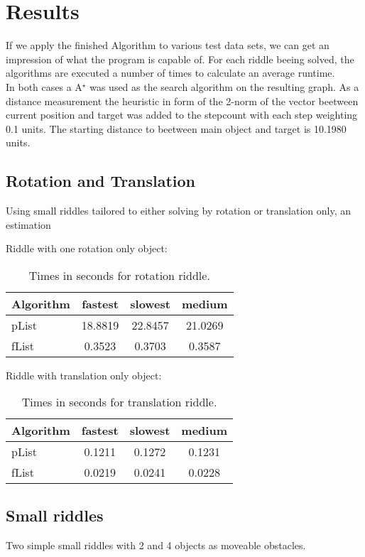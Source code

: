 \chapter{Results}
If we apply the finished Algorithm to various test data sets, we can get an impression of what the program is capable of.
For each riddle beeing solved, the algorithms are executed a number of times to calculate an average runtime.\\
In both cases a A$^\star$ was used as the search algorithm on the resulting graph. As a distance measurement the heuristic in form of the 2-norm of the vector beetween current position and target was added to the stepcount with each step weighting 0.1 units. The starting distance to beetween main object and target is
10.1980 units.
\section{Rotation and Translation}
Using small riddles tailored to either solving by rotation or translation only, an estimation 

\begin{figure}[H]
\end{figure}
Riddle with one rotation only object:
\begin{table}
\centering
\begin{tabular}{l||c|c|c|}
Algorithm& fastest & slowest & medium\\\hline
pList &  18.8819 & 22.8457  & 21.0269 \\
fList  & 0.3523&0.3703  &0.3587 \\
\end{tabular}
\caption{Times in seconds for rotation riddle.}
\end{table}
Riddle with translation only object:
\begin{table}
\centering
\begin{tabular}{l||c|c|c|}
Algorithm& fastest & slowest & medium\\\hline
pList &  0.1211& 0.1272  & 0.1231 \\
fList  & 0.0219 & 0.0241 & 0.0228 \\
\end{tabular}
\caption{Times in seconds for translation riddle.}
\end{table}

\section{Small riddles}
Two simple small riddles with 2 and 4 objects as moveable obstacles.

